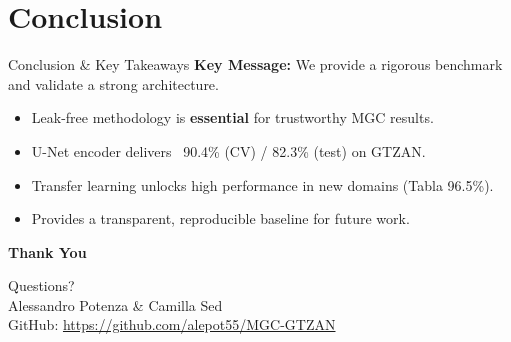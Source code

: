 \documentclass[aspectratio=169,xcolor=dvipsnames]{beamer}
\begin{document}
\section{Conclusion}
\begin{frame}{Conclusion \& Key Takeaways}
  \textbf{Key Message:} We provide a rigorous benchmark and validate a strong architecture.\\[4pt]
  \begin{itemize}
    \item Leak-free methodology is \textbf{essential} for trustworthy MGC results.
    \item U-Net encoder delivers ~90.4\% (CV) / 82.3\% (test) on GTZAN.
    \item Transfer learning unlocks high performance in new domains (Tabla 96.5\%).
    \item Provides a transparent, reproducible baseline for future work.
  \end{itemize}
\end{frame}

\begin{frame}[plain]
  \centering
  {\Huge \textbf{Thank You}}\par\vspace{0.5cm}
  {\Large Questions?}\\[0.6cm]
  {\normalsize Alessandro Potenza \& Camilla Sed}\\[0.2cm]
  {\footnotesize GitHub: \url{https://github.com/alepot55/MGC-GTZAN}}
\end{frame}

%   
%   
\end{document}
